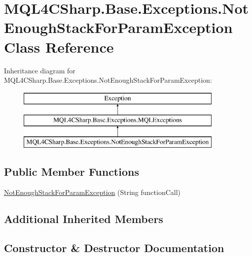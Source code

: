 \hypertarget{class_m_q_l4_c_sharp_1_1_base_1_1_exceptions_1_1_not_enough_stack_for_param_exception}{}\section{M\+Q\+L4\+C\+Sharp.\+Base.\+Exceptions.\+Not\+Enough\+Stack\+For\+Param\+Exception Class Reference}
\label{class_m_q_l4_c_sharp_1_1_base_1_1_exceptions_1_1_not_enough_stack_for_param_exception}
Inheritance diagram for M\+Q\+L4\+C\+Sharp.\+Base.\+Exceptions.\+Not\+Enough\+Stack\+For\+Param\+Exception\+:\begin{figure}[H]
\begin{center}
\leavevmode
\includegraphics[height=3.000000cm]{class_m_q_l4_c_sharp_1_1_base_1_1_exceptions_1_1_not_enough_stack_for_param_exception}
\end{center}
\end{figure}
\subsection*{Public Member Functions}
\begin{DoxyCompactItemize}
\item 
\hyperlink{class_m_q_l4_c_sharp_1_1_base_1_1_exceptions_1_1_not_enough_stack_for_param_exception_a1af44c36b913089eeb5789039ac5e604}{Not\+Enough\+Stack\+For\+Param\+Exception} (String function\+Call)
\end{DoxyCompactItemize}
\subsection*{Additional Inherited Members}


\subsection{Constructor \& Destructor Documentation}
